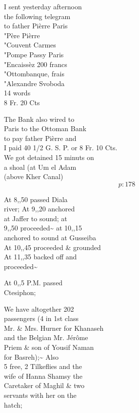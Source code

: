 \documentclass{report}
\begin{document}
	\par{
 	I sent yesterday afternoon\ \\the following telegram\ \\to father Pièrre Paris\ \\"Père Pièrre\ \\"Couvent Carmes\ \\"Pompe Passy Paris\ \\"Encaissèz 200 francs\ \\"Ottombanque, frais\ \\"Alexandre Svoboda\ \\14 words\ \\8 Fr. 20 Cts\ \\
	}

	\par{
 	The Bank also wired to\ \\Paris to the Ottoman Bank\ \\to pay father Pièrre and\ \\I paid 40 1/2 G. S. P. or 8 Fr. 10 Cts.\ \\We got detained 15 minuts on\ \\a shoal (at Um el Adam\ \\(above Kher Canal)\ \\
  \[p: 178 \]

	}


	\par{
 	At 8,,50 passed Diala\ \\river; At 9,,20 anchored\ \\at Jaffer to sound; at\ \\9,,50 proceeded\~{} at 10,,15\ \\anchored to sound at Gusseiba\ \\At 10,,45 proceeded \& grounded\ \\At 11,,35 backed off and\ \\proceeded\~{}\ \\
	}

	\par{
 	At 0,,5 P.M. passed\ \\Ctesiphon;\ \\
	}

	\par{
 	We have altogether 202\ \\passengers (4 in 1st class\ \\Mr. \& Mrs. Hurner for Khanaseh\ \\and the Belgian Mr. Jérôme\ \\Priem \& son of Yousif Naman\ \\for Basreh);\~{} Also\ \\5 free, 2 Tilkeflies and the\ \\wife of Hanna Shamsy the\ \\Caretaker of Maghil \& two\ \\servants with her on the\ \\hatch;\ \\
	}
\end{document}

